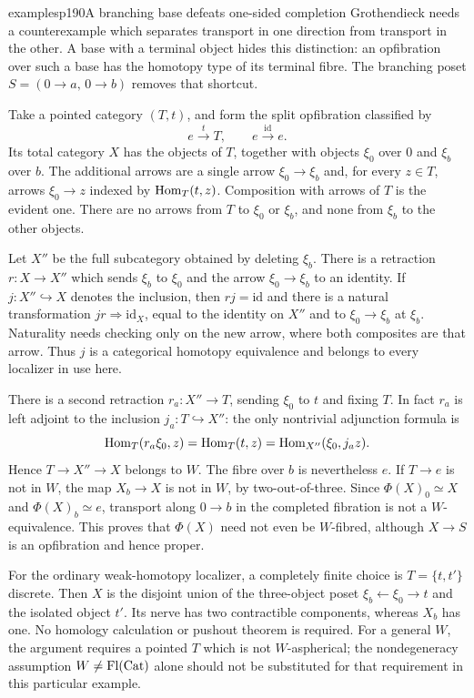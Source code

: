 \begin{dcomment}{examples}{p190}{A branching base defeats one-sided completion}
Grothendieck needs a counterexample which separates transport in one direction from transport in the other. A base with a terminal object hides this distinction: an opfibration over such a base has the homotopy type of its terminal fibre. The branching poset $S=(0\to a,\,0\to b)$ removes that shortcut.

Take a pointed category $(T,t)$, and form the split opfibration classified by
\[
 e\xrightarrow{t}T,\qquad e\xrightarrow{\mathrm{id}}e.
\]
Its total category $X$ has the objects of $T$, together with objects $\xi_0$ over $0$ and $\xi_b$ over $b$. The additional arrows are a single arrow $\xi_0\to\xi_b$ and, for every $z\in T$, arrows $\xi_0\to z$ indexed by $\mathrm{Hom}_T(t,z)$. Composition with arrows of $T$ is the evident one. There are no arrows from $T$ to $\xi_0$ or $\xi_b$, and none from $\xi_b$ to the other objects.

Let $X''$ be the full subcategory obtained by deleting $\xi_b$. There is a retraction $r:X\to X''$ which sends $\xi_b$ to $\xi_0$ and the arrow $\xi_0\to\xi_b$ to an identity. If $j:X''\hookrightarrow X$ denotes the inclusion, then $rj=\mathrm{id}$ and there is a natural transformation $jr\Rightarrow\mathrm{id}_X$, equal to the identity on $X''$ and to $\xi_0\to\xi_b$ at $\xi_b$. Naturality needs checking only on the new arrow, where both composites are that arrow. Thus $j$ is a categorical homotopy equivalence and belongs to every localizer in use here.

There is a second retraction $r_a:X''\to T$, sending $\xi_0$ to $t$ and fixing $T$. In fact $r_a$ is left adjoint to the inclusion $j_a:T\hookrightarrow X''$: the only nontrivial adjunction formula is
\[
 \mathrm{Hom}_T(r_a\xi_0,z)=\mathrm{Hom}_T(t,z)
              =\mathrm{Hom}_{X''}(\xi_0,j_a z).
\]
Hence $T\to X''\to X$ belongs to $W$. The fibre over $b$ is nevertheless $e$. If $T\to e$ is not in $W$, the map $X_b\to X$ is not in $W$, by two-out-of-three. Since $\Phi(X)_0\simeq X$ and $\Phi(X)_b\simeq e$, transport along $0\to b$ in the completed fibration is not a $W$-equivalence. This proves that $\Phi(X)$ need not even be $W$-fibred, although $X\to S$ is an opfibration and hence proper.

For the ordinary weak-homotopy localizer, a completely finite choice is $T=\{t,t'\}$ discrete. Then $X$ is the disjoint union of the three-object poset $\xi_b\leftarrow\xi_0\to t$ and the isolated object $t'$. Its nerve has two contractible components, whereas $X_b$ has one. No homology calculation or pushout theorem is required. For a general $W$, the argument requires a pointed $T$ which is not $W$-aspherical; the nondegeneracy assumption $W\ne\mathrm{Fl}(\mathrm{Cat})$ alone should not be substituted for that requirement in this particular example.


\end{dcomment}
